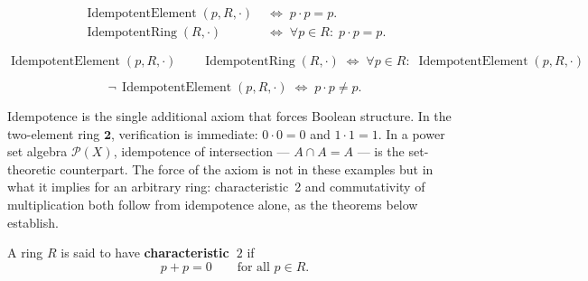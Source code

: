 \begin{remark*}
\[
\begin{aligned}
\operatorname{IdempotentElement}(p, R, \cdot)
&\;\Longleftrightarrow\; p \cdot p = p. \\[4pt]
\operatorname{IdempotentRing}(R, \cdot)
&\;\Longleftrightarrow\; \forall p \in R{:}\; p \cdot p = p.
\end{aligned}
\]
\end{remark*}

\begin{remark*}
\[
\operatorname{IdempotentElement}(p,R,\cdot)
\qquad
\operatorname{IdempotentRing}(R,\cdot)
\;\Longleftrightarrow\;
\forall p \in R{:}\;
\operatorname{IdempotentElement}(p,R,\cdot)
\]
\end{remark*}

\begin{remark*}
\[
\neg\,\operatorname{IdempotentElement}(p,R,\cdot)
\;\Longleftrightarrow\;
p \cdot p \neq p.
\]
\end{remark*}

\begin{remark*}[Interpretation]
Idempotence is the single additional axiom that forces Boolean
structure.  In the two-element ring $\mathbf{2}$, verification is
immediate: $0 \cdot 0 = 0$ and $1 \cdot 1 = 1$.  In a power set
algebra $\mathcal{P}(X)$, idempotence of intersection --- $A \cap A
= A$ --- is the set-theoretic counterpart.  The force of the axiom
is not in these examples but in what it implies for an arbitrary
ring: characteristic~2 and commutativity of multiplication both
follow from idempotence alone, as the theorems below establish.
\end{remark*}


\begin{tcolorbox}[colback=propbox, colframe=propborder, arc=2pt,
  left=6pt, right=6pt, top=4pt, bottom=4pt,
  title={\small\textbf{Definition --- Characteristic 2}},
  fonttitle=\small\bfseries]
\begin{definition}[Characteristic 2]
\label{def:characteristic-2}
A ring $R$ is said to have \textbf{characteristic~$2$} if
\[
p + p = 0 \qquad \text{for all } p \in R. \tag{10}
\]
\end{definition}
\end{tcolorbox}


